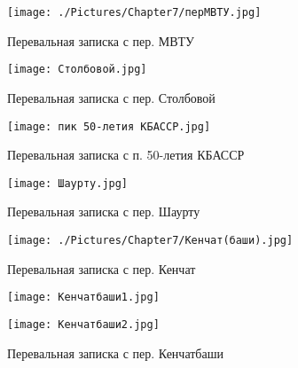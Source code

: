     \begin{figure}[ht]
        \begin{center}
            \begin{minipage}[h]{0.5\linewidth}\label{fig:pass_notes_mvtu}
                \texttt{[image: ./Pictures/Chapter7/перМВТУ.jpg]}
                \caption{Перевальная записка с пер. МВТУ}
            \end{minipage}%
            \begin{minipage}[h]{0.5\linewidth}\label{fig:pass_notes_stolbovoy}
                \texttt{[image: Столбовой.jpg]}
                \caption{Перевальная записка с пер. Столбовой}
            \end{minipage}
        \end{center}
    \end{figure}

    \begin{figure}[ht]\label{fig:pass_notes_kbassr}
        \centering
        \texttt{[image: пик 50-летия КБАССР.jpg]}
        \caption{Перевальная записка с п. 50-летия КБАССР}
    \end{figure}

    \begin{figure}[ht]
        \begin{center}
            \begin{minipage}[h]{0.5\linewidth}\label{fig:pass_notes_shaurtu}
                \texttt{[image: Шаурту.jpg]}
                \caption{Перевальная записка с пер. Шаурту}
            \end{minipage}%
            \begin{minipage}[h]{0.5\linewidth}\label{fig:pass_notes_kenchat}
                \texttt{[image: ./Pictures/Chapter7/Кенчат(баши).jpg]}
                \caption{Перевальная записка с пер. Кенчат}
            \end{minipage}
        \end{center}
    \end{figure}

    \begin{figure}[ht]\label{fig:pass_notes_kenchatbashi}
        \begin{center}
            \begin{minipage}[h]{0.5\linewidth}
                \texttt{[image: Кенчатбаши1.jpg]}
            \end{minipage}%
            \begin{minipage}[h]{0.5\linewidth}
                \texttt{[image: Кенчатбаши2.jpg]}
            \end{minipage}
        \end{center}
        \caption{Перевальная записка с пер. Кенчатбаши}
    \end{figure}

